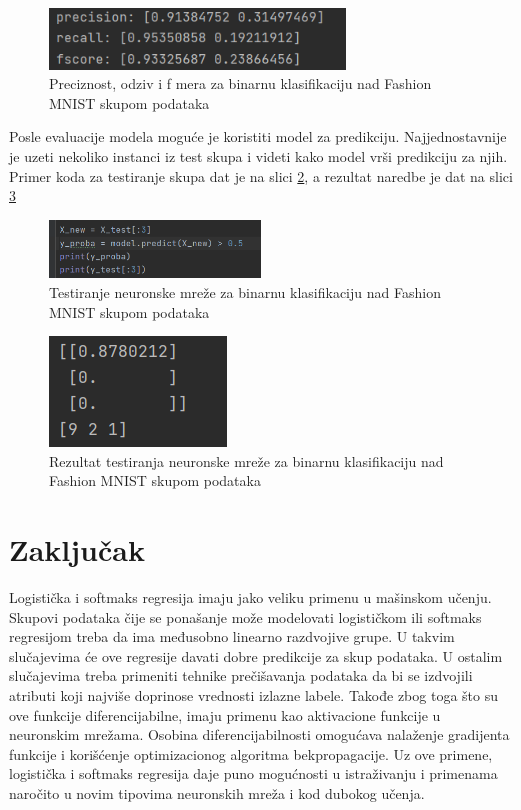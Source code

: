 \documentclass[a4paper,12pt]{report}
\begin{document}
\begin{figure}[h]
    \centering
    \includegraphics[width=0.7\textwidth]{logistic_NN_metrics.png}
    \caption{Preciznost, odziv i f mera za binarnu klasifikaciju nad Fashion MNIST skupom podataka}\label{fig:logistic_NN_metrics}
\end{figure}

Posle evaluacije modela moguće je koristiti model za predikciju. Najjednostavnije je uzeti nekoliko instanci iz test skupa i videti kako model vrši predikciju za njih. Primer koda za testiranje skupa dat je na slici \ref{fig:logistic_NN_test}, a rezultat naredbe je dat na slici \ref{fig:logistic_NN_test_result}\\

\begin{figure}[h]
    \centering
    \includegraphics[width=0.5\textwidth]{logistic_NN_test.png}
    \caption{Testiranje neuronske mreže za binarnu klasifikaciju nad Fashion MNIST skupom podataka}\label{fig:logistic_NN_test}
\end{figure}

\begin{figure}
	\centering
    \includegraphics{logistic_NN_test_result.png}
    \caption{Rezultat testiranja neuronske mreže za binarnu klasifikaciju nad Fashion MNIST skupom podataka}\label{fig:logistic_NN_test_result}
\end{figure}

\chapter{Zaključak}

Logistička i softmaks regresija imaju jako veliku primenu u mašinskom učenju. Skupovi podataka čije se ponašanje može modelovati logističkom ili softmaks regresijom treba da ima međusobno linearno razdvojive grupe. U takvim slučajevima će ove regresije davati dobre predikcije za skup podataka. U ostalim slučajevima treba primeniti tehnike prečišavanja podataka da bi se izdvojili atributi koji najviše doprinose vrednosti izlazne labele. Takođe zbog toga što su ove funkcije diferencijabilne, imaju primenu kao aktivacione funkcije u neuronskim mrežama. Osobina diferencijabilnosti omogućava nalaženje gradijenta funkcije i korišćenje optimizacionog algoritma bekpropagacije. Uz ove primene, logistička i softmaks regresija daje puno mogućnosti u istraživanju i primenama naročito u novim tipovima neuronskih mreža i kod dubokog učenja.
\end{document}
